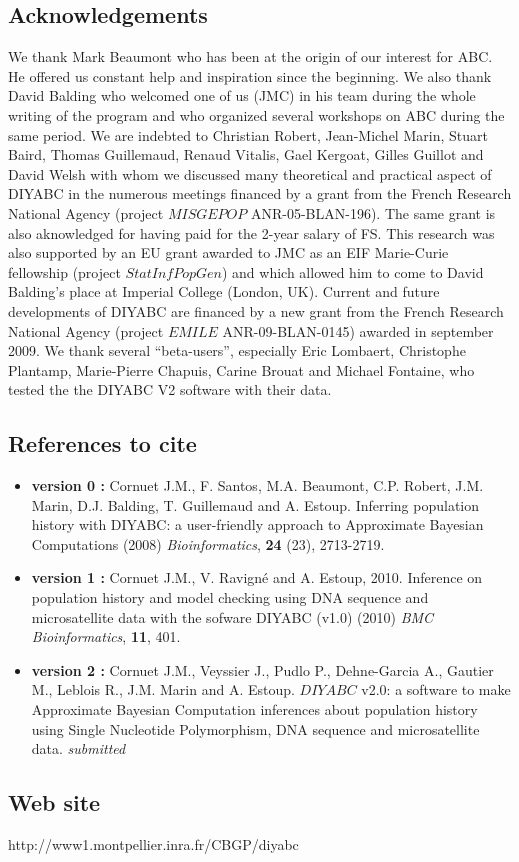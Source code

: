 \documentclass [a4paper]{report}
\let\subsectionv\subsection
\renewcommand{\subsection}[1]{\subsectionv{#1} \setcounter{paragraph}{0}}
\begin{document}
\subsection{Acknowledgements}
We thank Mark Beaumont who has been at the origin of our interest for ABC. He offered us constant help and inspiration since the beginning. We also thank David Balding who welcomed one of us (JMC) in his team during the whole writing of the program and who organized several workshops on ABC during the same period. We are indebted to Christian Robert, Jean-Michel Marin, Stuart Baird, Thomas Guillemaud, Renaud Vitalis, Gael Kergoat, Gilles Guillot and David Welsh with whom we discussed many theoretical and practical aspect of DIYABC in the numerous meetings financed by a grant from the French Research National Agency (project $MISGEPOP$ ANR-05-BLAN-196). The same grant is also aknowledged for having paid for the 2-year salary of FS. This research was also supported by an EU grant awarded to JMC as an EIF Marie-Curie fellowship (project $StatInfPopGen$) and which allowed him to come to David Balding's place at Imperial College (London, UK). Current and future developments of DIYABC are financed by a new grant from the French Research National Agency (project $EMILE$ ANR-09-BLAN-0145) awarded in september 2009. We thank several “beta-users”, especially Eric Lombaert, Christophe Plantamp, Marie-Pierre Chapuis, Carine Brouat and Michael Fontaine, who tested the the DIYABC V2 software with their data.
\subsection{References to cite}
\begin{itemize}
\item \textbf{version 0 :} Cornuet J.M., F. Santos, M.A. Beaumont, C.P. Robert, J.M. Marin, D.J. Balding, T. Guillemaud and A. Estoup. Inferring population history with DIYABC: a user-friendly approach to Approximate Bayesian Computations (2008) \emph{Bioinformatics}, \textbf{24} (23), 2713-2719.
\item  \textbf{version 1 :}  Cornuet J.M., V. Ravign\'e and A. Estoup, 2010. Inference on population history and model checking using DNA sequence and microsatellite data with the sofware DIYABC (v1.0) (2010) \emph{BMC Bioinformatics}, \textbf{11}, 401.
\item  \textbf{version 2 :}  Cornuet J.M., Veyssier J., Pudlo P., Dehne-Garcia A., Gautier M., Leblois R., J.M. Marin and A. Estoup. $DIYABC$ v2.0: a software to make Approximate Bayesian Computation inferences about population history using Single Nucleotide Polymorphism, DNA sequence and microsatellite data. \emph{submitted}
\end{itemize}
\subsection{Web site}
http://www1.montpellier.inra.fr/CBGP/diyabc\\



\newpage




\end{document}
